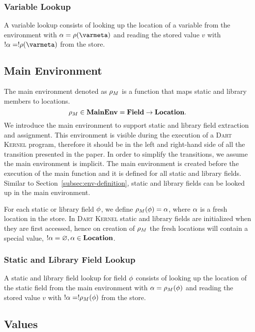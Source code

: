 \documentclass[a4paper,oneside,fleqn]{article}
\newcommand{\kernel}{\textsc{Dart Kernel}}
\renewcommand{\emptyset}{\varnothing}
\newcommand{\dmenv}{\mathbf{MainEnv}}
\newcommand{\dfield}{\mathbf{Field}}
\begin{document}
\subsubsection{Variable Lookup}
\label{subsubsec:variable-lookup}

A variable lookup consists of looking up the location of a variable from the environment with $\loc = \env(\varmeta)$ and reading the stored value $v$ with $\deref{\loc} = \deref{\env(\varmeta)}$ from the store.


\subsection{Main Environment}
\label{subsec:main-env}

The main environment denoted as $\rho_{M}$ is a function that maps static and library members to locations.
\[
    \mainenv \in \dmenv = \dfield \rightarrow \dlocation.
\]
We introduce the main environment to support static and library field extraction and assignment.
This environment is visible during the execution of a \kernel{} program, therefore it should be in the left and right-hand side of all the transition presented in the paper.
In order to simplify the transitions, we assume the main environment is implicit.
The main environment is created before the execution of the main function and it is defined for all static and library fields.
Similar to Section~\ref{subsec:env-definition}, static and library fields can be looked up in the main environment.

For each static or library field $\phi$, we define $\rho_{M}(\phi) = \alpha$, where $\alpha$ is a fresh location in the store.
In \kernel{} static and library fields are initialized when they are first accessed, hence on creation of $\rho_{M}$ the fresh locations will contain a special value, $\deref{\loc} = \emptyset, \loc \in \dlocation$.

\subsubsection{Static and Library Field Lookup}
\label{subsubsec:static-field-lookup}

A static and library field lookup for field $\phi$ consists of looking up the location of the static field from the main environment with $\alpha = \rho_{M}(\phi)$ and reading the stored value $v$ with $!\alpha = !\rho_{M}(\phi)$ from the store.


\subsection{Values}
\label{sec:values}
\end{document}
